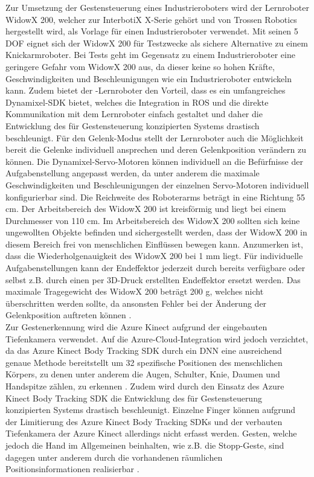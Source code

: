 Zur Umsetzung der Gestensteuerung eines Industrieroboters wird der Lernroboter WidowX 200, welcher zur InterbotiX X-Serie gehört und von Trossen Robotics hergestellt wird, als Vorlage für einen Industrieroboter verwendet. Mit seinen 5 DOF eignet sich der WidowX 200 für Testzwecke als sichere Alternative zu einem Knickarmroboter. Bei Tests geht im Gegensatz zu einem Industrieroboter eine geringere Gefahr vom WidowX 200 aus, da dieser keine so hohen Kräfte, Geschwindigkeiten und Beschleunigungen wie ein Industrieroboter entwickeln kann. Zudem bietet der -Lernroboter den Vorteil, dass es ein umfangreiches Dynamixel-SDK bietet, welches die Integration in ROS und die direkte Kommunikation mit dem Lernroboter einfach gestaltet und daher die Entwicklung des für Gestensteuerung konzipierten Systems drastisch beschleunigt. Für den Gelenk-Modus stellt der Lernroboter auch die Möglichkeit bereit die Gelenke individuell ansprechen und deren Gelenkposition verändern zu können. Die Dynamixel-Servo-Motoren können individuell an die Befürfnisse der Aufgabenstellung angepasst werden, da unter anderem die maximale Geschwindigkeiten und Beschleunigungen der einzelnen Servo-Motoren individuell konfigurierbar sind. Die Reichweite des Roboterarms beträgt in eine Richtung \num{55} cm. Der Arbeitsbereich des WidowX 200 ist kreisförmig und liegt bei einem Durchmesser von \num{110} cm. Im Arbeitsbereich des WidowX 200 sollten sich keine ungewollten Objekte befinden und sichergestellt werden, dass der WidowX 200 in diesem Bereich frei von menschlichen Einflüssen bewegen kann. Anzumerken ist, dass die Wiederholgenauigkeit des WidowX 200 bei \num{1} mm liegt. Für individuelle Aufgabenstellungen kann der Endeffektor jederzeit durch bereits verfügbare oder selbst z.B. durch einen per 3D-Druck erstellten Endeffektor ersetzt werden. Das maximale Tragegewicht des WidowX 200 beträgt 200 g, welches nicht überschritten werden sollte, da ansonsten Fehler bei der Änderung der Gelenkposition auftreten können \cite{widowx_200_nodate}.\\

Zur Gestenerkennung wird die Azure Kinect aufgrund der eingebauten Tiefenkamera verwendet. Auf die Azure-Cloud-Integration wird jedoch verzichtet, da das Azure Kinect Body Tracking SDK durch ein DNN eine ausreichend genaue Methode bereitstellt \cite{qm13_azure_kinect_release_notes_nodate} um 32 spezifische Positionen des menschlichen Körpers, zu denen unter anderem die Augen, Schulter, Knie, Daumen und Handspitze zählen, zu erkennen \cite{qm13_azure_joints_nodate}. Zudem wird durch den Einsatz des Azure Kinect Body Tracking SDK die Entwicklung des für Gestensteuerung konzipierten Systems drastisch beschleunigt. Einzelne Finger können aufgrund der Limitierung des Azure Kinect Body Tracking SDKs und der verbauten Tiefenkamera der Azure Kinect allerdings nicht erfasst werden. Gesten, welche jedoch die Hand im Allgemeinen beinhalten, wie z.B. die Stopp-Geste, sind dagegen unter anderem durch die vorhandenen räumlichen Positionsinformationen realisierbar \cite{microsoftazure-kinect-sensor-sdk_2020}.\\

